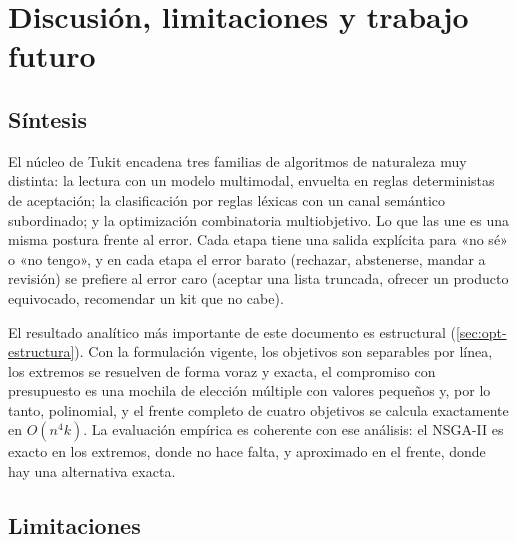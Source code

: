 \section{Discusión, limitaciones y trabajo futuro}
\label{sec:discusion}

\subsection{Síntesis}

El núcleo de Tukit encadena tres familias de algoritmos de naturaleza muy
distinta: la lectura con un modelo multimodal, envuelta en reglas
deterministas de aceptación; la clasificación por reglas léxicas con un canal
semántico subordinado; y la optimización combinatoria multiobjetivo. Lo que
las une es una misma postura frente al error. Cada etapa tiene una salida
explícita para «no sé» o «no tengo», y en cada etapa el error barato
(rechazar, abstenerse, mandar a revisión) se prefiere al error caro (aceptar
una lista truncada, ofrecer un producto equivocado, recomendar un kit que no
cabe).

El resultado analítico más importante de este documento es estructural
(\cref{sec:opt-estructura}). Con la formulación vigente, los objetivos son
separables por línea, los extremos se resuelven de forma voraz y exacta, el
compromiso con presupuesto es una mochila de elección múltiple con valores
pequeños y, por lo tanto, polinomial, y el frente completo de cuatro objetivos
se calcula exactamente en $O(n^4k)$. La evaluación empírica es coherente con
ese análisis: el NSGA-II es exacto en los extremos, donde no hace falta, y
aproximado en el frente, donde hay una alternativa exacta.

\subsection{Limitaciones}

